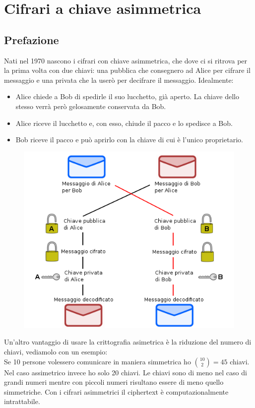 \documentclass[10pt,a4paper]{article}
\begin{document}
\section{Cifrari a chiave asimmetrica}
\subsection{Prefazione}
Nati nel 1970 nascono i cifrari con chiave asimmetrica, che dove ci si ritrova per la prima volta con due chiavi: una pubblica che consegnero ad Alice per cifrare il messaggio e una privata che la userò per decifrare il messaggio. Idealmente:
\begin{itemize}
\item Alice chiede a Bob di spedirle il suo lucchetto, già aperto. La chiave dello stesso verrà però gelosamente conservata da Bob.
\item Alice riceve il lucchetto e, con esso, chiude il pacco e lo spedisce a Bob.
\item Bob riceve il pacco e può aprirlo con la chiave di cui è l'unico proprietario.
\end{itemize}

\begin{figure}[htbp]
\includegraphics[scale=0.4]{immagini/Crittografia_asimmetrica_schema.png}
\end{figure}

Un'altro vantaggio di usare la crittografia asimetrica è la riduzione del numero di chiavi, vediamolo con un esempio:\\
Se 10 persone volessero comunicare in maniera simmetrica ho $\binom{10}{2} = 45$ chiavi. Nel caso assimetrico invece ho solo 20 chiavi. Le chiavi sono di meno nel caso di grandi numeri mentre con piccoli numeri risultano essere di meno quello simmetriche. Con i cifrari asimmetrici il ciphertext è computazionalmente intrattabile.
\newpage
\end{document}
